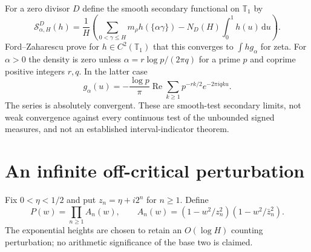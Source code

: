 \documentclass[11pt,a4paper]{article}
\theoremstyle{definition}
\theoremstyle{remark}
\newcommand{\T}{\mathbb T}
\newcommand{\dd}{\,\mathrm d}
\DeclareMathOperator{\Rea}{Re}
\begin{document}
For a zero divisor $D$ define the smooth secondary functional on $\T_1$ by
\begin{equation}\label{eq:secondary}
 \mathcal S_{\alpha,H}^{D}(h)=\frac1H
 \left(\sum_{0<\gamma\le H}m_\rho h(\{\alpha\gamma\})
              -N_D(H)\int_0^1h(u)\dd u\right).
\end{equation}
Ford--Zaharescu \cite[Theorem 1 and Corollary 2]{FZ} prove for
$h\in C^2(\T_1)$ that this converges to $\int h g_\alpha$ for zeta.
For $\alpha>0$ the density is zero unless
$\alpha=r\log p/(2\pi q)$ for a prime $p$ and coprime positive integers
$r,q$. In the latter case
\begin{equation}\label{eq:bias}
 g_\alpha(u)=-\frac{\log p}{\pi}\Rea
       \sum_{k\ge1}p^{-rk/2}e^{-2\pi i qku}.
\end{equation}
The series is absolutely convergent. These are smooth-test secondary
limits, not weak convergence against every continuous test of the unbounded
signed measures, and not an established interval-indicator theorem.

\section{An infinite off-critical perturbation}\label{sec:product}

Fix $0<\eta<1/2$ and put $z_n=\eta+i2^n$ for $n\ge1$. Define
\begin{equation}\label{eq:product}
 P(w)=\prod_{n\ge1}A_n(w),\qquad
 A_n(w)=(1-w^2/z_n^2)(1-w^2/\bar z_n^2).
\end{equation}
The exponential heights are chosen to retain an $O(\log H)$ counting
perturbation; no arithmetic significance of the base two is claimed.
\end{document}
